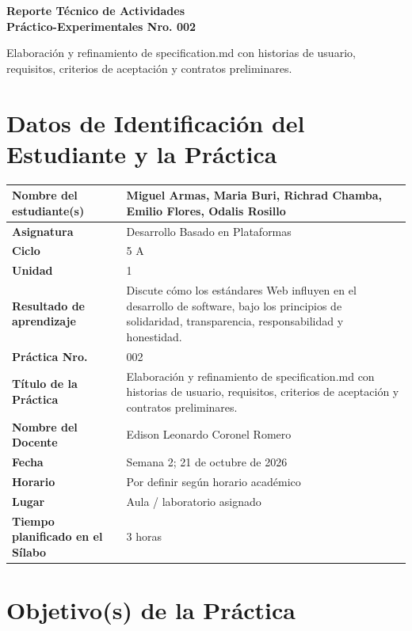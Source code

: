 \documentclass[11pt,a4paper]{article}
\begin{document}
\thispagestyle{fancy}
\begin{center}
{\bfseries\fontsize{21}{24}\selectfont Reporte Técnico de Actividades\\ Práctico-Experimentales Nro. 002\par}
\vspace{0.25cm}
{\large Elaboración y refinamiento de specification.md con historias de usuario, requisitos, criterios de aceptación y contratos preliminares.}
\end{center}

\section{Datos de Identificación del Estudiante y la Práctica}
\begin{tabularx}{\textwidth}{|L{0.43\textwidth}|Y|}
\hline
\textbf{Nombre del estudiante(s)} & Miguel Armas, Maria Buri, Richrad Chamba, Emilio Flores, Odalis Rosillo\\ \hline
\textbf{Asignatura} & Desarrollo Basado en Plataformas \\ \hline
\textbf{Ciclo} & 5 A \\ \hline
\textbf{Unidad} & 1 \\ \hline
\textbf{Resultado de aprendizaje} & Discute cómo los estándares Web influyen en el desarrollo de software, bajo los principios de solidaridad, transparencia, responsabilidad y honestidad. \\ \hline
\textbf{Práctica Nro.} & 002 \\ \hline
\textbf{Título de la Práctica} & Elaboración y refinamiento de specification.md con historias de usuario, requisitos, criterios de aceptación y contratos preliminares. \\ \hline
\textbf{Nombre del Docente} & Edison Leonardo Coronel Romero \\ \hline
\textbf{Fecha} & Semana 2; 21 de octubre de 2026 \\ \hline
\textbf{Horario} & Por definir según horario académico \\ \hline
\textbf{Lugar} & Aula / laboratorio asignado \\ \hline
\textbf{Tiempo planificado en el Sílabo} & 3 horas \\ \hline
\end{tabularx}

\section{Objetivo(s) de la Práctica}\label{objetivos-de-la-pruxe1ctica}
\end{document}
